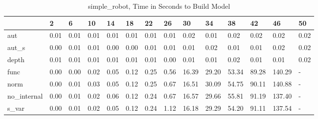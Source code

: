 \begin{table}
\caption{simple_robot, Time in Seconds to Build Model}
\label{simple_robot_model_time}
\begin{tabular}{llllllllllllll}
\toprule
 & 2 & 6 & 10 & 14 & 18 & 22 & 26 & 30 & 34 & 38 & 42 & 46 & 50 \\
\midrule
aut & 0.01 & 0.01 & 0.01 & 0.01 & 0.01 & 0.01 & 0.01 & 0.02 & 0.01 & 0.02 & 0.02 & 0.02 & 0.02 \\
aut_s & 0.00 & 0.01 & 0.01 & 0.00 & 0.00 & 0.01 & 0.01 & 0.01 & 0.02 & 0.01 & 0.01 & 0.02 & 0.02 \\
depth & 0.01 & 0.01 & 0.01 & 0.01 & 0.01 & 0.01 & 0.00 & 0.01 & 0.01 & 0.02 & 0.01 & 0.01 & 0.02 \\
func & 0.00 & 0.00 & 0.02 & 0.05 & 0.12 & 0.25 & 0.56 & 16.39 & 29.20 & 53.34 & 89.28 & 140.29 & - \\
norm & 0.00 & 0.01 & 0.03 & 0.05 & 0.12 & 0.25 & 0.67 & 16.51 & 30.09 & 54.75 & 90.11 & 140.88 & - \\
no_internal & 0.00 & 0.01 & 0.02 & 0.06 & 0.12 & 0.24 & 0.67 & 16.57 & 29.66 & 55.81 & 91.19 & 137.40 & - \\
s_var & 0.00 & 0.01 & 0.02 & 0.05 & 0.12 & 0.24 & 1.12 & 16.18 & 29.29 & 54.20 & 91.11 & 137.54 & - \\
\bottomrule
\end{tabular}
\end{table}
